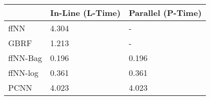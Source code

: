 \begin{tabular}{lll}
\toprule
{} & In-Line (L-Time) & Parallel (P-Time) \\
\midrule
ffNN     &            4.304 &                 - \\
GBRF     &            1.213 &                 - \\
ffNN-Bag &            0.196 &             0.196 \\
ffNN-log &            0.361 &             0.361 \\
PCNN     &            4.023 &             4.023 \\
\bottomrule
\end{tabular}
